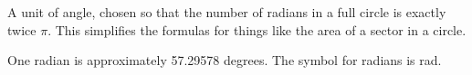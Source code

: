 A unit of angle, chosen so that the number of radians in a full
circle is exactly twice $ \pi . $ This simplifies the formulas for things
like the area of a sector in a circle.
\par
One radian is approximately 57.29578 degrees. The symbol for radians is rad.